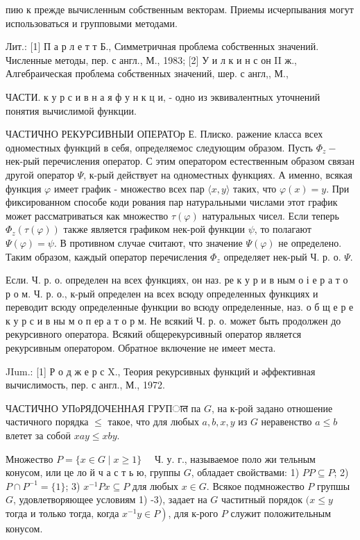 \documentclass[10pt]{article}
\begin{document}
пию к прежде вычисленным собственным векторам. Приемы исчерпывания могут использоваться и групповыми методами.



Лит.: [1] П а р л е т т Б., Симметричная проблема собственных значений. Численные методы, пер. с англ., М., 1983; [2] У и л к и н с он II ж., Алгебраическая проблема собственных значений, шер. с англ,, М.,

ЧАСТИ. к у р с и в н а я ф у н к ц и, - одно из эквивалентных уточнений понятия вычислимой функции.



ЧАСТИЧНО РЕКУРСИВНЫИ ОПЕРАТОр Е. Плиско. ражение класса всех одноместных функций в себя, определяемос следующим образом. Пусть $\Phi_{z}-$ нек-рый перечисления оператор. С этим оператором естественным образом связан другой оператор $\Psi$, к-рый действует на одноместных функциях. А именно, всякая функция $\varphi$ имеет график - множество всех пар $\langle x, y\rangle$ таких, что $\varphi(x)=y$. При фиксированном способе коди рования пар натуральными числами этот график может рассматриваться как множество $\tau(\varphi)$ натуральных чисел. Если теперь $\Phi_{z}(\tau(\varphi))$ также является графиком нек-рой функции $\psi$, то полагают $\Psi(\varphi)=\psi$. В противном случае считают, что значение $\Psi(\varphi)$ не определено. Таким образом, каждый оператор перечисления $\Phi_{z}$ определяет нек-рый Ч. р. о. $\Psi$.



Если. Ч. р. о. определен на всех функциях, он наз. ре к у р и в ным о і е р а т о р о м. Ч. р. о., к-рый определен на всех всюду определенных функциях и переводит всюду определенные функции во всюду определенные, наз. о б щ е р е к у р с и в ны м о п ер а т о р м. Не всякий Ч. р. о. может быть продолжен до рекурсивного оператора. Всякий общерекурсивный оператор является рекурсивным оператором. Обратное включение не имеет места.



JIum.: [1] Р о д ж е р с X., Теория рекурсивных функций и әффективная вычислимость, пер. с англ., М., 1972.



ЧАСТИЧНО УПоРЯДОЧЕННАЯ ГРУПात па $G$, на к-рой задано отношение частичного порядка $\leqslant$ такое, что для любых $a, b, x, y$ из $G$ неравенство $a \leqslant b$ влетет за собоӥ $x a y \leqslant x b y$.



Множество $P=\{x \in G \mid x \geqslant 1\} \quad$ Ч. у. г., называемое поло жи тельным конусом, или це ло й ч а с т ь ю, группы $G$, обладает свойствами: 1) $P P \subseteq P$; 2) $P \cap P^{-1}=\{1\}$; 3) $x^{-1} P x \subseteq P$ для любых $x \in G$. Всякое подмножество $P$ групшы $G$, удовлетворяющее условиям 1) -3), задает на $G$ частитный порядок $(x \leqslant y$ тогда и только тогда, когда $\left.x^{-1} y \in P\right)$, для к-рого $P$ служит положительным конусом.
\end{document}
